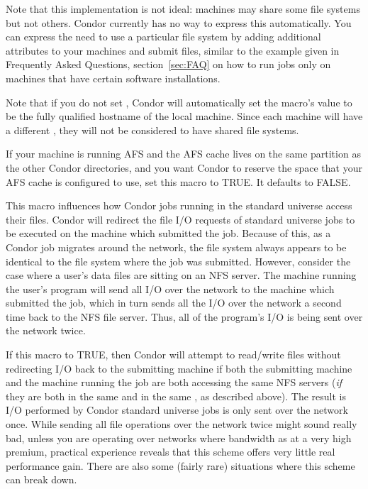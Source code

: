 \begin{description}
Note that this implementation is not ideal: machines may share some
file systems but not others. Condor currently has no way to express
this automatically. You can express the need to use a
particular file system by adding additional attributes to your machines
and submit files, similar to the example given in 
Frequently Asked Questions, 
section~\ref{sec:FAQ} on
how to run jobs only on machines that have 
certain software installations.

Note that if you do not set 
, Condor will
automatically set the macro's value to be the fully qualified hostname
of the local machine.
Since each machine will have a different
,
they will not be considered to have shared file systems.

  
      
\item[\Macro{RESERVE\_AFS\_CACHE}] \label{param:ReserveAfsCache} If
  your machine is running AFS and the AFS cache lives on the same
  partition as the other Condor directories, and you want Condor to
  reserve the space that your AFS cache is configured to use, set this
  macro to TRUE.  It defaults to FALSE.
  
\item[\Macro{USE\_NFS}] \label{param:UseNfs} This macro influences
  how Condor jobs running in the standard universe access their
  files.  Condor will redirect the file I/O requests
  of standard universe jobs to be executed on the machine which
  submitted the job.  Because of this, as a Condor job migrates around
  the network, the file system always appears to be identical to the
  file system where the job was submitted.  However, consider the case
  where a user's data files are sitting on an NFS server. The machine
  running the user's program will send all I/O over the network to the
  machine which submitted the job, which in turn sends all the I/O
  over the network a second time back to the NFS file server. Thus,
  all of the program's I/O is being sent over the network twice.
          
  If this macro to TRUE, then Condor will attempt to
  read/write files without redirecting I/O back to the submitting
  machine if both the submitting machine and the machine running the job
  are both accessing the same NFS servers (\emph{if} they are both in the
  same  and in the same ,
  as described above).  The result is I/O performed by Condor standard
  universe jobs is only sent over the network once.  
  While sending all file operations over the network twice might sound
  really bad, unless you are operating over networks where bandwidth
  as at a very high premium, practical experience reveals that this
  scheme offers very little real performance gain.  There are also
  some (fairly rare) situations where this scheme can break down.
  

\end{description}
